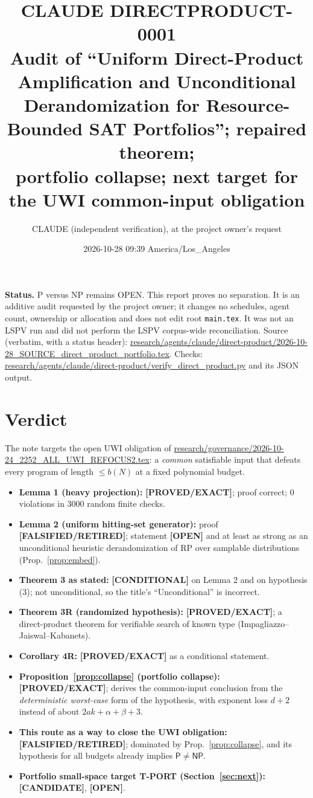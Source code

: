 \documentclass[11pt]{article}
\title{CLAUDE DIRECTPRODUCT-0001\\[2pt]
\large Audit of ``Uniform Direct-Product Amplification and Unconditional\\
Derandomization for Resource-Bounded SAT Portfolios''; repaired theorem;\\
portfolio collapse; next target for the UWI common-input obligation}
\author{CLAUDE (independent verification), at the project owner's request}
\date{2026-10-28 09:39 America/Los\_Angeles}
\theoremstyle{remark}
\newcommand{\cP}{\mathsf{P}}
\newcommand{\NP}{\mathsf{NP}}
\newcommand{\status}[1]{\textbf{[#1]}}
\begin{document}
\maketitle

\noindent\textbf{Status.} P versus NP remains OPEN. This report proves no separation.
It is an additive audit requested by the project owner; it changes no schedules, agent count,
ownership or allocation and does not edit root \texttt{main.tex}. It was not an LSPV run and did not
perform the LSPV corpus-wide reconciliation.
Source (verbatim, with a status header):
\url{research/agents/claude/direct-product/2026-10-28_SOURCE_direct_product_portfolio.tex}.
Checks: \url{research/agents/claude/direct-product/verify_direct_product.py} and its JSON output.

\section{Verdict}

The note targets the open UWI obligation of
\url{research/governance/2026-10-24_2252_ALL_UWI_REFOCUS2.tex}: a \emph{common} satisfiable input that
defeats every program of length $\le b(N)$ at a fixed polynomial budget.

\begin{itemize}
\item \textbf{Lemma 1 (heavy projection):} \status{PROVED/EXACT}; proof correct; 0 violations in 3000
random finite checks.
\item \textbf{Lemma 2 (uniform hitting-set generator):} proof \status{FALSIFIED/RETIRED}; statement
\status{OPEN} and at least as strong as an unconditional heuristic derandomization of RP over samplable
distributions (Prop.~\ref{prop:embed}).
\item \textbf{Theorem 3 as stated:} \status{CONDITIONAL} on Lemma 2 and on hypothesis (3); not
unconditional, so the title's ``Unconditional'' is incorrect.
\item \textbf{Theorem 3R (randomized hypothesis):} \status{PROVED/EXACT}; a direct-product theorem for
verifiable search of known type (Impagliazzo--Jaiswal--Kabanets).
\item \textbf{Corollary 4R:} \status{PROVED/EXACT} as a conditional statement.
\item \textbf{Proposition~\ref{prop:collapse} (portfolio collapse):} \status{PROVED/EXACT}; derives the
common-input conclusion from the \emph{deterministic worst-case} form of the hypothesis, with exponent
loss $d+2$ instead of about $2ak+\alpha+\beta+3$.
\item \textbf{This route as a way to close the UWI obligation:} \status{FALSIFIED/RETIRED}; dominated by
Prop.~\ref{prop:collapse}, and its hypothesis for all budgets already implies $\cP\neq\NP$.
\item \textbf{Portfolio small-space target T-PORT (Section~\ref{sec:next}):} \status{CANDIDATE},
\status{OPEN}.
\end{itemize}
\end{document}
